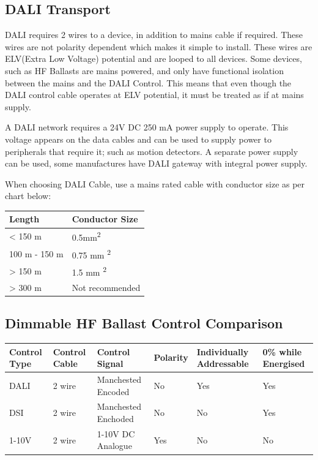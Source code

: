 \documentclass{article}
\begin{document}
\subsection{DALI Transport}
DALI requires 2 wires to a device, in addition to mains cable if required. These wires are not polarity dependent which makes it simple to install. These wires are ELV(Extra Low Voltage) potential and are looped to all devices. Some devices, such as HF Ballasts are mains powered, and only have functional isolation between the mains and the DALI Control. This means that even though the DALI control cable operates at ELV potential, it must be treated as if at mains supply.

A DALI network requires a 24V DC 250 mA power supply to operate. This voltage appears on the data cables and can be used to supply power to peripherals that require it; such as motion detectors. A separate power supply can be used, some manufactures have DALI gateway with integral power supply.

When choosing DALI Cable, use a mains rated cable with conductor size as per chart below:

\begin{tabular}{|l|l|}
\hline
\textbf{Length} & \textbf{Conductor Size} \\ \hline
< 150 m & 0.5mm\textsuperscript{2} \\ \hline
100 m - 150 m & 0.75 mm \textsuperscript{2} \\ \hline
> 150 m & 1.5 mm \textsuperscript{2} \\ \hline
> 300 m & Not recommended \\ \hline
\end{tabular}

\subsection{Dimmable HF Ballast Control Comparison}
\begin{tabular}{|p{}|p{}|p{}|p{}|p{}|p{}|}

\hline

\textbf{Control Type}	& \textbf{Control Cable}	& \textbf{Control Signal}	&\textbf{Polarity}	&\textbf{Individually Addressable} & \textbf{0\% while Energised}  \\ \hline
DALI & 2 wire & Manchested Encoded & No & Yes & Yes \\ \hline
DSI &  2 wire & Manchested Enchoded & No & No & Yes \\ \hline
1-10V & 2 wire & 1-10V DC Analogue & Yes & No & No \\ \hline

\end{tabular}
\end{document}
